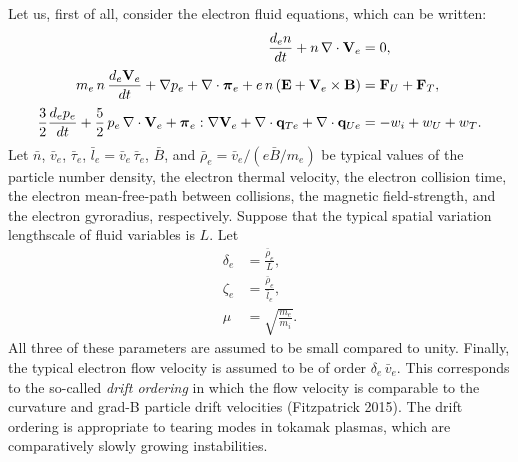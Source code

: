 \documentclass[notitlepage,12pt]{article}
\newcommand{\bpi}{\mbox{\boldmath$\pi$}}
\begin{document}
Let us, first of all, consider the electron fluid equations, which can
be written:
\begin{align}
\frac{d_e n}{dt} + n\,\nabla\cdot{\bf V}_e &= 0,\\[0.5ex]
m_e\, n\,\frac{d_e {\bf V}_e}{dt} + \nabla p_e+ \nabla\cdot \bpi_e + e\, n\,
({\bf E} + {\bf V}_e\times {\bf B})& = {\bf F}_U +{\bf F}_T,\\[0.5ex]
\frac{3}{2}\frac{d_e p_e}{dt} + \frac{5}{2}\,p_e\,\nabla\cdot{\bf V}_e
+ \bpi_e:\nabla{\bf V}_e+ \nabla\cdot{\bf q}_{Te} 
+ \nabla\cdot{\bf q}_{Ue} &= -w_i+w_U + w_T.
\end{align}
Let $\bar{n}$, $\bar{v}_e$, $\bar{\tau}_e$, $\bar{l}_e=\bar{v}_e\,\bar{\tau}_e$, $\bar{B}$,
and $\bar{\rho}_e =\bar{ v}_e/(e\bar{B}/m_e)$  be typical values
of the particle number density, the electron thermal velocity, the electron collision time, the electron
mean-free-path between collisions,  the magnetic field-strength, and the
electron gyroradius,  respectively. 
Suppose that the typical spatial variation lengthscale of fluid variables is $L$. Let
 \begin{align}
\delta_e &=\frac{\bar{\rho}_e}{L},\\[0.5ex]
\zeta_e &= \frac{\bar{\rho}_e}{\bar{l}_e},\\[0.5ex]
\mu &= \sqrt{\frac{m_e}{m_i}}.
\end{align}
All three of these parameters are assumed to be  small
compared to unity. Finally, the typical electron flow velocity is assumed to be of order $\delta_e\,\bar{v}_e$. This corresponds
to the so-called {\em drift ordering}\/ in which the flow velocity is comparable to the curvature and grad-B particle
drift velocities (Fitzpatrick 2015). The drift ordering is appropriate to tearing modes in tokamak plasmas, which are comparatively
slowly growing instabilities. 
\end{document}

